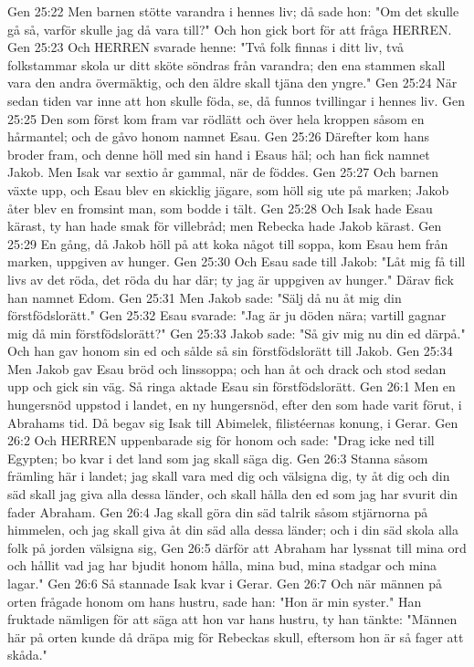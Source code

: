 Gen 25:22  Men barnen stötte varandra i hennes liv; då sade hon: "Om det skulle gå så, varför skulle jag då vara till?" Och hon gick bort för att fråga HERREN.
Gen 25:23  Och HERREN svarade henne: "Två folk finnas i ditt liv, två folkstammar skola ur ditt sköte söndras från varandra; den ena stammen skall vara den andra övermäktig, och den äldre skall tjäna den yngre."
Gen 25:24  När sedan tiden var inne att hon skulle föda, se, då funnos tvillingar i hennes liv.
Gen 25:25  Den som först kom fram var rödlätt och över hela kroppen såsom en hårmantel; och de gåvo honom namnet Esau.
Gen 25:26  Därefter kom hans broder fram, och denne höll med sin hand i Esaus häl; och han fick namnet Jakob. Men Isak var sextio år gammal, när de föddes.
Gen 25:27  Och barnen växte upp, och Esau blev en skicklig jägare, som höll sig ute på marken; Jakob åter blev en fromsint man, som bodde i tält.
Gen 25:28  Och Isak hade Esau kärast, ty han hade smak för villebråd; men Rebecka hade Jakob kärast.
Gen 25:29  En gång, då Jakob höll på att koka något till soppa, kom Esau hem från marken, uppgiven av hunger.
Gen 25:30  Och Esau sade till Jakob: "Låt mig få till livs av det röda, det röda du har där; ty jag är uppgiven av hunger." Därav fick han namnet Edom.
Gen 25:31  Men Jakob sade: "Sälj då nu åt mig din förstfödslorätt."
Gen 25:32  Esau svarade: "Jag är ju döden nära; vartill gagnar mig då min förstfödslorätt?"
Gen 25:33  Jakob sade: "Så giv mig nu din ed därpå." Och han gav honom sin ed och sålde så sin förstfödslorätt till Jakob.
Gen 25:34  Men Jakob gav Esau bröd och linssoppa; och han åt och drack och stod sedan upp och gick sin väg. Så ringa aktade Esau sin förstfödslorätt.
Gen 26:1  Men en hungersnöd uppstod i landet, en ny hungersnöd, efter den som hade varit förut, i Abrahams tid. Då begav sig Isak till Abimelek, filistéernas konung, i Gerar.
Gen 26:2  Och HERREN uppenbarade sig för honom och sade: "Drag icke ned till Egypten; bo kvar i det land som jag skall säga dig.
Gen 26:3  Stanna såsom främling här i landet; jag skall vara med dig och välsigna dig, ty åt dig och din säd skall jag giva alla dessa länder, och skall hålla den ed som jag har svurit din fader Abraham.
Gen 26:4  Jag skall göra din säd talrik såsom stjärnorna på himmelen, och jag skall giva åt din säd alla dessa länder; och i din säd skola alla folk på jorden välsigna sig,
Gen 26:5  därför att Abraham har lyssnat till mina ord och hållit vad jag har bjudit honom hålla, mina bud, mina stadgar och mina lagar."
Gen 26:6  Så stannade Isak kvar i Gerar.
Gen 26:7  Och när männen på orten frågade honom om hans hustru, sade han: "Hon är min syster." Han fruktade nämligen för att säga att hon var hans hustru, ty han tänkte: "Männen här på orten kunde då dräpa mig för Rebeckas skull, eftersom hon är så fager att skåda."

